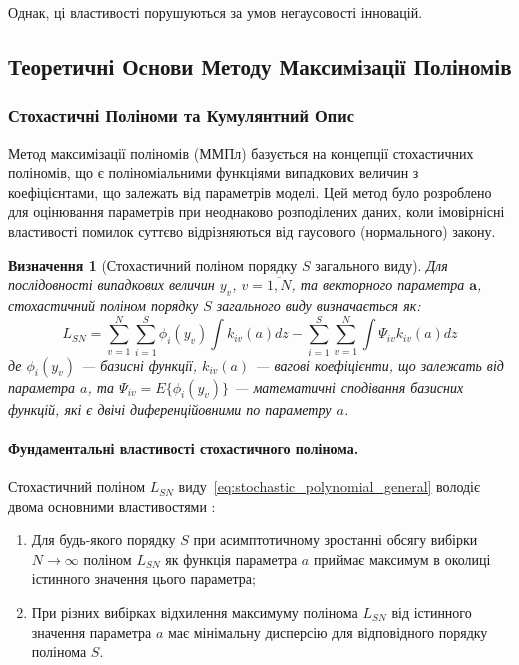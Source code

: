 \documentclass[12pt,a4paper]{article}
\newtheorem{definition}[theorem]{Визначення}
\begin{document}
Однак, ці властивості порушуються за умов негаусовості інновацій.

\subsection{Теоретичні Основи Методу Максимізації Поліномів}
\label{subsec:pmm_theory}

\subsubsection{Стохастичні Поліноми та Кумулянтний Опис}

Метод максимізації поліномів (ММПл) базується на концепції стохастичних поліномів, що є поліноміальними функціями випадкових величин з коефіцієнтами, що залежать від параметрів моделі. Цей метод було розроблено для оцінювання параметрів при неоднаково розподілених даних, коли імовірнісні властивості помилок суттєво відрізняються від гаусового (нормального) закону.

\begin{definition}[Стохастичний поліном порядку $S$ загального виду]
Для послідовності випадкових величин $y_v$, $v = \overline{1,N}$, та векторного параметра $\mathbf{a}$, стохастичний поліном порядку $S$ загального виду визначається як:
\begin{equation}
\label{eq:stochastic_polynomial_general}
L_{SN} = \sum_{v=1}^{N} \sum_{i=1}^{S} \phi_i(y_v) \int k_{iv}(a) dz - \sum_{i=1}^{S} \sum_{v=1}^{N} \int \Psi_{iv} k_{iv}(a) dz
\end{equation}
де $\phi_i(y_v)$ --- базисні функції, $k_{iv}(a)$ --- вагові коефіцієнти, що залежать від параметра $a$, та $\Psi_{iv} = E\{\phi_i(y_v)\}$ --- математичні сподівання базисних функцій, які є двічі диференційовними по параметру $a$.
\end{definition}

\paragraph{Фундаментальні властивості стохастичного полінома.}

Стохастичний поліном $L_{SN}$ виду~\eqref{eq:stochastic_polynomial_general} володіє двома основними властивостями \cite{kunchenko2002polynomial}:

\begin{enumerate}
\item Для будь-якого порядку $S$ при асимптотичному зростанні обсягу вибірки $N \to \infty$ поліном $L_{SN}$ як функція параметра $a$ приймає максимум в околиці істинного значення цього параметра;

\item При різних вибірках відхилення максимуму полінома $L_{SN}$ від істинного значення параметра $a$ має мінімальну дисперсію для відповідного порядку полінома $S$.
\end{enumerate}
\end{document}
